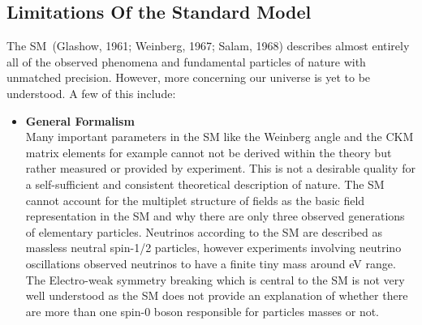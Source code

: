 \subsection{Limitations Of the Standard Model}
The SM~(Glashow, 1961; Weinberg, 1967; Salam, 1968) describes almost entirely all of the observed phenomena and fundamental particles of nature with unmatched precision.
However, more concerning our universe is yet to be understood. A few of this include:
\begin{itemize}
\item \textbf{General Formalism} \mbox{}\\ Many important parameters in the SM like the Weinberg angle and the CKM matrix elements for example cannot not be derived within the theory but rather measured or provided by experiment. This is not a desirable quality for a self-sufficient and consistent theoretical description of nature. The SM cannot account for the multiplet structure of fields as the basic field representation in the SM and why there are only three observed generations of elementary particles. Neutrinos according to the SM are described as massless neutral spin-1/2 particles, however experiments involving neutrino oscillations observed neutrinos to have a finite tiny mass around eV range. The Electro-weak symmetry breaking which is central to the SM is not very well understood as the SM does not provide an explanation of whether there are more than one spin-0 boson responsible for particles masses or not.


\end{itemize}
